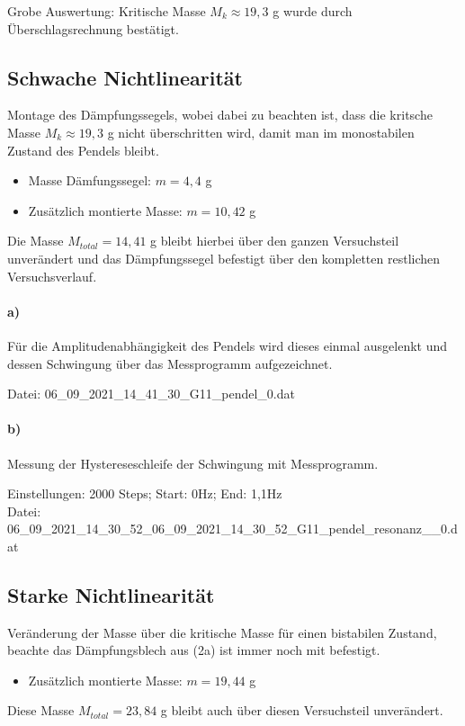 Grobe Auswertung: Kritische Masse $M_k\approx19,3$ g wurde durch Überschlagsrechnung bestätigt.

\subsection*{Schwache Nichtlinearität}
\label{sub:weakLin}
Montage des Dämpfungssegels, wobei dabei zu beachten ist, dass die kritsche Masse $M_k\approx19,3$ g nicht überschritten wird, damit man im monostabilen Zustand des Pendels bleibt.
\begin{itemize}
    \item Masse Dämfungssegel: $m=4,4$ g
    \item Zusätzlich montierte Masse: $m = 10,42$ g
\end{itemize}
Die Masse $M_{total}= 14,41$ g bleibt hierbei über den ganzen Versuchsteil unverändert und das Dämpfungssegel befestigt über den kompletten restlichen Versuchsverlauf.
\paragraph{a)}
Für die Amplitudenabhängigkeit des Pendels wird dieses einmal ausgelenkt und dessen Schwingung über das Messprogramm aufgezeichnet.

Datei: 06\_09\_2021\_14\_41\_30\_G11\_pendel\_0.dat

\paragraph{b)}
Messung der Hystereseschleife der Schwingung mit Messprogramm.

Einstellungen: 2000 Steps; Start: 0Hz; End: 1,1Hz\\
Datei: 06\_09\_2021\_14\_30\_52\_06\_09\_2021\_14\_30\_52\_G11\_pendel\_resonanz\_\_0.dat\\

\subsection*{Starke Nichtlinearität}
\label{sub:strongLin}
Veränderung der Masse über die kritische Masse für einen bistabilen Zustand, beachte das Dämpfungsblech aus (2a) ist immer noch mit befestigt.
\begin{itemize}
    \item Zusätzlich montierte Masse: $m = 19,44$ g
\end{itemize}
Diese Masse $M_{total}=23,84$ g bleibt auch über diesen Versuchsteil unverändert.

